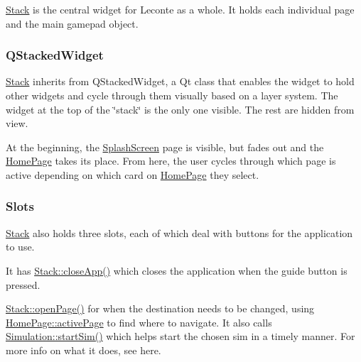 \mbox{\hyperlink{classStack}{Stack}} is the central widget for Leconte as a whole. It holds each individual page and the main gamepad object.

\subsubsection*{Q\+Stacked\+Widget}

\mbox{\hyperlink{classStack}{Stack}} inherits from Q\+Stacked\+Widget, a Qt class that enables the widget to hold other widgets and cycle through them visually based on a layer system. The widget at the top of the \char`\"{}stack\char`\"{} is the only one visible. The rest are hidden from view.

At the beginning, the \mbox{\hyperlink{classSplashScreen}{Splash\+Screen}} page is visible, but fades out and the \mbox{\hyperlink{classHomePage}{Home\+Page}} takes its place. From here, the user cycles through which page is active depending on which card on \mbox{\hyperlink{classHomePage}{Home\+Page}} they select.

\subsubsection*{Slots}

\mbox{\hyperlink{classStack}{Stack}} also holds three slots, each of which deal with buttons for the application to use.

It has {\ttfamily \mbox{\hyperlink{classStack_a2f8a3dee32407abe994b7332282d03de}{Stack\+::close\+App()}}} which closes the application when the guide button is pressed.


\begin{DoxyCode}{0}
\DoxyCodeLine{    \}}
\DoxyCodeLine{\}}
\end{DoxyCode}


{\ttfamily \mbox{\hyperlink{classStack_a3663db1c1578aabe63286d4f2bb6fc6f}{Stack\+::open\+Page()}}} for when the destination needs to be changed, using {\ttfamily \mbox{\hyperlink{classHomePage_a0b6a91525a77e5ea66505666f7ba7c8d}{Home\+Page\+::active\+Page}}} to find where to navigate. It also calls {\ttfamily \mbox{\hyperlink{classSimulation_ac523544ffc2b4cffed1d2a6ead5809b1}{Simulation\+::start\+Sim()}}} which helps start the chosen sim in a timely manner. For more info on what it does, see here.


